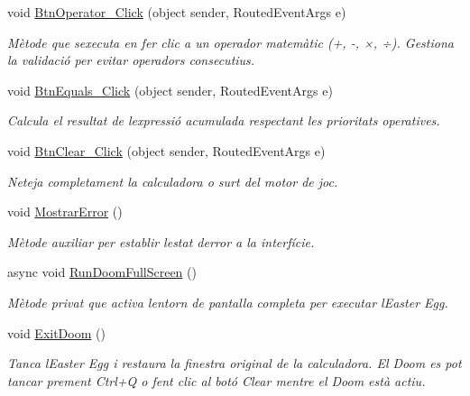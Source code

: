 \begin{DoxyCompactItemize}
void \mbox{\hyperlink{class_p_a_c4___calculadora_1_1_main_window_a42ad8a5d111a5dc3e848a3a4be51bf36}{Btn\+Operator\+\_\+\+Click}} (object sender, Routed\+Event\+Args e)
\begin{DoxyCompactList}\small\item\em Mètode que s\textquotesingle{}executa en fer clic a un operador matemàtic (+, -\/, ×, ÷). Gestiona la validació per evitar operadors consecutius. \end{DoxyCompactList}\item 
void \mbox{\hyperlink{class_p_a_c4___calculadora_1_1_main_window_aa608d9b7d35fe6f657adb4f7af99ba22}{Btn\+Equals\+\_\+\+Click}} (object sender, Routed\+Event\+Args e)
\begin{DoxyCompactList}\small\item\em Calcula el resultat de l\textquotesingle{}expressió acumulada respectant les prioritats operatives. \end{DoxyCompactList}\item 
void \mbox{\hyperlink{class_p_a_c4___calculadora_1_1_main_window_a81c0d28ed62031f812ddf46780d2cda1}{Btn\+Clear\+\_\+\+Click}} (object sender, Routed\+Event\+Args e)
\begin{DoxyCompactList}\small\item\em Neteja completament la calculadora o surt del motor de joc. \end{DoxyCompactList}\item 
void \mbox{\hyperlink{class_p_a_c4___calculadora_1_1_main_window_a0c53c4846653c6a7f127f4582d0cf449}{Mostrar\+Error}} ()
\begin{DoxyCompactList}\small\item\em Mètode auxiliar per establir l\textquotesingle{}estat d\textquotesingle{}error a la interfície. \end{DoxyCompactList}\item 
async void \mbox{\hyperlink{class_p_a_c4___calculadora_1_1_main_window_a023883a85a8b64c14e91725146630d27}{Run\+Doom\+Full\+Screen}} ()
\begin{DoxyCompactList}\small\item\em Mètode privat que activa l\textquotesingle{}entorn de pantalla completa per executar l\textquotesingle{}Easter Egg. \end{DoxyCompactList}\item 
void \mbox{\hyperlink{class_p_a_c4___calculadora_1_1_main_window_a1b0f5b87aa37a064fb973e1cd3910816}{Exit\+Doom}} ()
\begin{DoxyCompactList}\small\item\em Tanca l\textquotesingle{}Easter Egg i restaura la finestra original de la calculadora. El Doom es pot tancar prement Ctrl+Q o fent clic al botó Clear mentre el Doom està actiu. ~\newline

\end{DoxyCompactList}
\end{DoxyCompactItemize}
